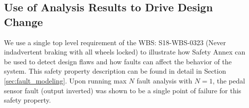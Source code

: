\subsection{Use of Analysis Results to Drive Design Change}
We use a single top level requirement of the WBS: S18-WBS-0323 (Never indadvertent braking with all wheels locked) to illustrate how Safety Annex can be used to detect design flaws and how faults can affect the behavior of the system. This safety property description can be found in detail in Section \ref{sec:fault_modeling}. Upon running max $N$ fault analysis with $N = 1$, the pedal sensor fault (output inverted) was shown to be a single point of failure for this safety property. 

